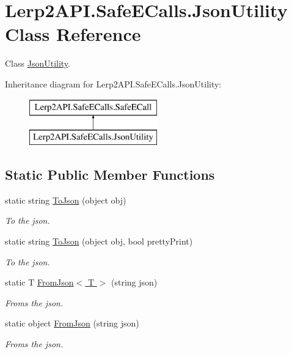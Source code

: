\hypertarget{class_lerp2_a_p_i_1_1_safe_e_calls_1_1_json_utility}{}\section{Lerp2\+A\+P\+I.\+Safe\+E\+Calls.\+Json\+Utility Class Reference}
\label{class_lerp2_a_p_i_1_1_safe_e_calls_1_1_json_utility}


Class \hyperlink{class_lerp2_a_p_i_1_1_safe_e_calls_1_1_json_utility}{Json\+Utility}.  


Inheritance diagram for Lerp2\+A\+P\+I.\+Safe\+E\+Calls.\+Json\+Utility\+:\begin{figure}[H]
\begin{center}
\leavevmode
\includegraphics[height=2.000000cm]{class_lerp2_a_p_i_1_1_safe_e_calls_1_1_json_utility}
\end{center}
\end{figure}
\subsection*{Static Public Member Functions}
\begin{DoxyCompactItemize}
\item 
static string \hyperlink{class_lerp2_a_p_i_1_1_safe_e_calls_1_1_json_utility_a9848d9ae46be99c56ced6660bdb8e866}{To\+Json} (object obj)
\begin{DoxyCompactList}\small\item\em To the json. \end{DoxyCompactList}\item 
static string \hyperlink{class_lerp2_a_p_i_1_1_safe_e_calls_1_1_json_utility_a72a33a009d1a09529f448869f85e6627}{To\+Json} (object obj, bool pretty\+Print)
\begin{DoxyCompactList}\small\item\em To the json. \end{DoxyCompactList}\item 
static T \hyperlink{class_lerp2_a_p_i_1_1_safe_e_calls_1_1_json_utility_a333244fb4cde796ee95197c46ddef8be}{From\+Json$<$ T $>$} (string json)
\begin{DoxyCompactList}\small\item\em Froms the json. \end{DoxyCompactList}\item 
static object \hyperlink{class_lerp2_a_p_i_1_1_safe_e_calls_1_1_json_utility_a9e43c6d45f22ef6046f596254ed1579c}{From\+Json} (string json)
\begin{DoxyCompactList}\small\item\em Froms the json. \end{DoxyCompactList}\end{DoxyCompactItemize}
